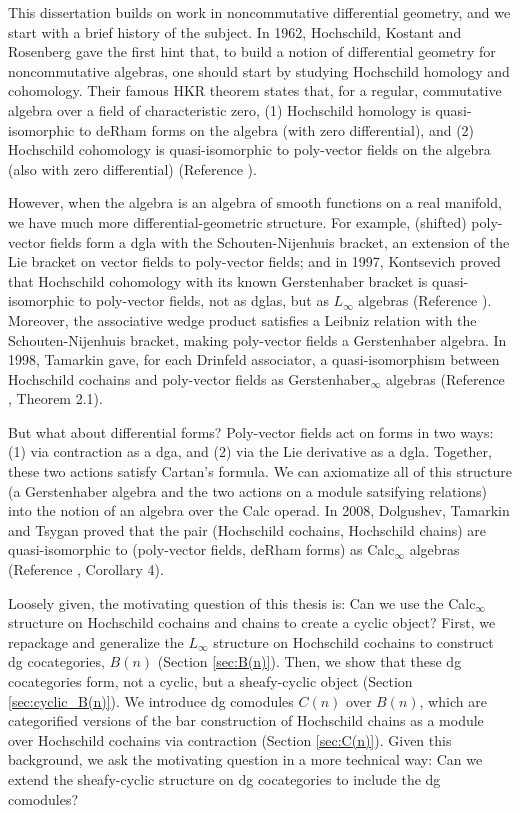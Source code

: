 %

This dissertation builds on work in noncommutative differential geometry, and we start with a brief history of the subject. In 1962, Hochschild, Kostant and Rosenberg gave the first hint that, to build a notion of differential geometry for noncommutative algebras, one should start by studying Hochschild homology and cohomology. Their famous HKR theorem states that, for a regular, commutative algebra over a field of characteristic zero, (1) Hochschild homology is quasi-isomorphic to deRham forms on the algebra (with zero differential), and (2) Hochschild cohomology is quasi-isomorphic to poly-vector fields on the algebra (also with zero differential) (Reference \cite{HKR}).

However, when the algebra is an algebra of smooth functions on a real manifold, we have much more differential-geometric structure. For example, (shifted) poly-vector fields form a dgla with the Schouten-Nijenhuis bracket, an extension of the Lie bracket on vector fields to poly-vector fields; and in 1997, Kontsevich proved that Hochschild cohomology with its known Gerstenhaber bracket is quasi-isomorphic to poly-vector fields, not as dglas, but as $L_\infty$ algebras (Reference \cite{K}). Moreover, the associative wedge product satisfies a Leibniz relation with the Schouten-Nijenhuis bracket, making poly-vector fields a Gerstenhaber algebra. In 1998, Tamarkin gave, for each Drinfeld associator, a quasi-isomorphism between Hochschild cochains and poly-vector fields as Gerstenhaber$_\infty$ algebras (Reference \cite{Tam}, Theorem 2.1).

But what about differential forms? Poly-vector fields act on forms in two ways: (1) via contraction as a dga, and (2) via the Lie derivative as a dgla. Together, these two actions satisfy Cartan's formula. We can axiomatize all of this structure (a Gerstenhaber algebra and the two actions on a module satsifying relations) into the notion of an algebra over the Calc operad. In 2008, Dolgushev, Tamarkin and Tsygan proved that the pair (Hochschild cochains, Hochschild chains) are quasi-isomorphic to (poly-vector fields, deRham forms) as Calc$_\infty$ algebras (Reference \cite{DTT}, Corollary 4).

Loosely given, the motivating question of this thesis is: Can we use the Calc$_\infty$ structure on Hochschild cochains and chains to create a cyclic object? First, we repackage and generalize the $L_\infty$ structure on Hochschild cochains to construct dg cocategories, $B(n)$ (Section \ref{sec:B(n)}). Then, we show that these dg cocategories form, not a cyclic, but a sheafy-cyclic object (Section \ref{sec:cyclic_B(n)}). We introduce dg comodules $C(n)$ over $B(n)$, which are categorified versions of the bar construction of Hochschild chains as a module over Hochschild cochains via contraction (Section \ref{sec:C(n)}). Given this background, we ask the motivating question in a more technical way: Can we extend the sheafy-cyclic structure on dg cocategories to include the dg comodules?

